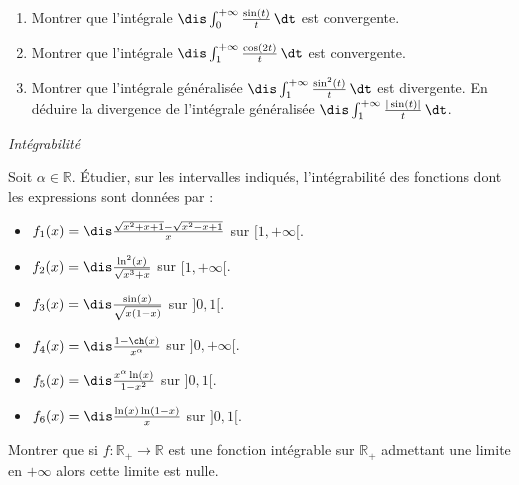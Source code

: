 \documentclass[a4paper,10pt]{report}
\begin{document}
\begin{Exercice}{} \begin{enumerate}
\item Montrer que l'int\'egrale $\dis \int_0^{+ \infty} \frac{\sin(t)}{t}\, \dt$ est convergente.
\item Montrer que l'int\'egrale $\dis \int_1^{+\infty}\frac{\cos(2t)}{t}\, \dt$ est convergente.
\item Montrer que l'int\'egrale g\'en\'eralis\'ee $\dis \int_1^{+\infty}\frac{\sin^2(t)}{t} \, \dt$ est divergente. En d\'eduire la divergence de l'int\'egrale g\'en\'eralis\'ee $\dis \int_1^{+\infty}\frac{|\sin(t)|}{t} \, \dt$.
\end{enumerate}
\end{Exercice}


\medskip

\begin{center}
\textit{{ {\large Intégrabilité}}}
\end{center}

\medskip

\begin{Exercice}{} Soit $\alpha \in \mathbb{R}$. Étudier, sur les intervalles indiqués, l'int\'egrabilit\'e des fonctions dont les expressions sont données par :
\begin{multicols}{2}
\begin{itemize}
\item $f_1(x)=\dis\frac{\sqrt{x^2+x+1}-\sqrt{x^2-x+1}}{x}$ sur \newline $[1,+\infty[$.
\item $f_2(x)=\dis\frac{\ln^2(x)}{\sqrt{x^3+x}}$ sur $[1,+\infty[$.
\item $f_3(x)=\dis\frac{\sin(x)}{\sqrt{x(1-x)}}$ sur $]0,1[$.
\columnbreak
\item $f_4(x)=\dis\frac{1-\ch(x)}{x^{\alpha}}$ sur $]0,+\infty[$.
\item $f_5(x)=\dis\frac{x^{\alpha}\ln(x)}{1-x^2}$ sur $]0,1[$.
\item $f_6(x)=\dis\frac{\ln(x)\ln(1-x)}{x}$ sur $]0,1[$.
\end{itemize}
\end{multicols}

\vspace{0.1cm}
\end{Exercice}



\begin{Exercice}{} Montrer que si $f : \mathbb{R}_+ \rightarrow \mathbb{R}$ est une fonction intégrable sur $\mathbb{R}_+$ admettant une limite en $+ \infty$ alors cette limite est nulle. 
\end{Exercice} 
\end{document}
